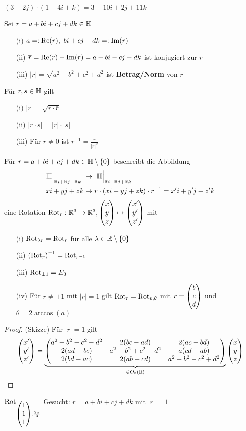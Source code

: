 \begin{bsp}
	$(3+2j) \cdot (1-4i+k) = 3 - 10i + 2j + 11k$
\end{bsp}

\begin{defi}
	Sei $r = a + bi + cj + dk \in \mathbb H$
	\begin{enumerate}
		\item[(i)] $a =: \operatorname{Re}(r), \ bi+cj+dk =: \operatorname{Im}(r)$
		\item[(ii)] $\overline{r} = \operatorname{Re}(r) - \operatorname{Im}(r) = a - bi - cj - dk$ ist konjugiert zur $r$
		\item[(iii)] $|r| = \sqrt{a^2 + b^2 + c^2 + d^2}$ ist \textbf{Betrag/Norm} von $r$
	\end{enumerate}
\end{defi}

\begin{bem}
	Für $r,s \in \mathbb H$ gilt
	\begin{enumerate}
		\item[(i)] $|r| = \sqrt{r \cdot \overline{r}}$
		\item[(ii)] $|r \cdot s| = |r| \cdot |s|$
		\item[(iii)] Für $r \neq 0$ ist $r^{-1} = \frac{\overline{r}}{|r|^2}$
	\end{enumerate}
\end{bem}

\begin{thm}
	Für $r = a + bi + cj + dk \in \mathbb H \setminus \left\{ 0 \right\}$ beschreibt die Abbildung
	\begin{align*}
		\mathbb H \Big|_{\mathbb R i + \mathbb R j + \mathbb R k} \ & \to \ \mathbb H \Big|_{\mathbb R i + \mathbb R j + \mathbb R k}\\
		xi + yj + zk & \to r \cdot (xi + yj + zk) \cdot r^{-1} = x'i + y'j + z'k
	\end{align*}
	eine Rotation $\operatorname{Rot}_r : \mathbb R^3 \to \mathbb R^3, \begin{pmatrix}{x}\\{y}\\{z}\end{pmatrix} \mapsto \begin{pmatrix}{x'}\\{y'}\\{z'}\end{pmatrix}$ mit
	\begin{enumerate}
		\item[(i)] $\operatorname{Rot}_{\lambda r} = \operatorname{Rot}_r$ für alle $\lambda \in \mathbb R \setminus
			\left\{ 0 \right\}$
		\item[(ii)] $\left( \operatorname{Rot}_r \right)^{-1} = \operatorname{Rot}_{r^{-1}}$
		\item[(iii)] $\operatorname{Rot}_{\pm 1} = E_3$
		\item[(iv)] Für $r \neq \pm 1$ mit $|r| = 1$ gilt $\operatorname{Rot}_r = \operatorname{Rot}_{v, \theta}$ mit $r =
		\begin{pmatrix}{b}\\{c}\\{d}\end{pmatrix}$ und $\theta = 2 \arccos (a)$
	\end{enumerate}
	\begin{proof} (Skizze)
		Für $|r| = 1$ gilt
		$$
			\begin{pmatrix}{x'}\\{y'}\\{z'}\end{pmatrix} =
			\underbrace{
				\begin{pmatrix}
					a^2+b^2-c^2-d^2 & 2(bc-ad) & 2(ac-bd)\\
					2(ad+bc) & a^2-b^2+c^2-d^2 & a(cd-ab)\\
					2(bd-ac) & 2(ab+cd) & a^2-b^2-c^2+d^2\\
				\end{pmatrix}
			}_{\in O_3(\mathbb R)}
			\begin{pmatrix}{x}\\{y}\\{z}\end{pmatrix}
		$$
	\end{proof}
\end{thm}

\begin{bsp}
	$\operatorname{Rot}_{\begin{pmatrix}{1}\\{1}\\{1}\end{pmatrix}, \frac{2\pi}{3}}$ Gesucht: $r = a+bi+cj+dk$ mit $|r| = 1$
\end{bsp}

